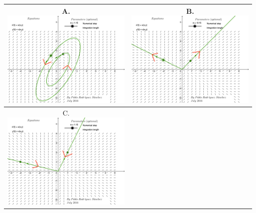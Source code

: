 \clearpage

\hspace{-0.7in} \begin{tabular}{|c|c|}
\hline
A. \includegraphics[width=0.45\tw]{14/14-pure-imag.png} &
B. \includegraphics[width=0.45\tw]{14/14-distinct-positive.png} \\
\hline
C. \includegraphics[width=0.45\tw]{14/14-distinct-neg.png} &

\end{tabular}
